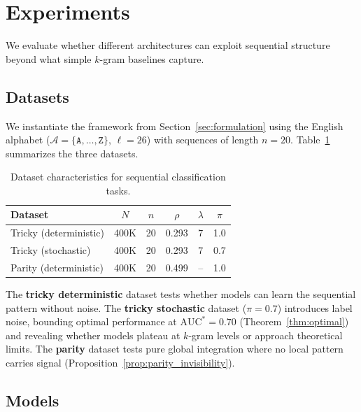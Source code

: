 \section{Experiments}
\label{sec:experiments}

We evaluate whether different architectures can exploit sequential structure beyond what simple $k$-gram baselines capture.

\subsection{Datasets}
\label{subsec:datasets}

We instantiate the framework from Section~\ref{sec:formulation} using the English alphabet ($\mathcal{A} = \{\texttt{A}, \ldots, \texttt{Z}\}$, $\ell = 26$) with sequences of length $n = 20$. Table~\ref{tab:datasets} summarizes the three datasets.

\begin{table}[h]
\centering
\caption{Dataset characteristics for sequential classification tasks.}
\label{tab:datasets}
\begin{tabular}{lccccc}
\toprule
Dataset & $N$ & $n$ & $\rho$ & $\lambda$ & $\pi$ \\
\midrule
Tricky (deterministic) & 400K & 20 & 0.293 & 7 & 1.0 \\
Tricky (stochastic) & 400K & 20 & 0.293 & 7 & 0.7 \\
Parity (deterministic) & 400K & 20 & 0.499 & -- & 1.0 \\
\bottomrule
\end{tabular}
\end{table}

The \textbf{tricky deterministic} dataset tests whether models can learn the sequential pattern without noise. The \textbf{tricky stochastic} dataset ($\pi = 0.7$) introduces label noise, bounding optimal performance at $\text{AUC}^* = 0.70$ (Theorem~\ref{thm:optimal}) and revealing whether models plateau at $k$-gram levels or approach theoretical limits. The \textbf{parity} dataset tests pure global integration where no local pattern carries signal (Proposition~\ref{prop:parity_invisibility}).

\subsection{Models}
\label{subsec:models}

